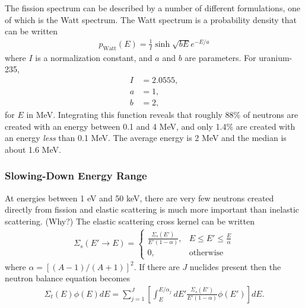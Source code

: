 \documentclass[11pt]{article}
\begin{document}
The fission spectrum can be described by a number of different formulations, one of which is the Watt spectrum.  The Watt spectrum is a probability density that can be written
\begin{align}
  p_\text{Watt}(E) = \frac{1}{I} \sinh\sqrt{bE} e^{-E/a}
\end{align}
where \(I\) is a normalization constant, and \(a\) and \(b\) are parameters.  For uranium-235,
\begin{align}
  I &= 2.0555, \\
  a &= 1, \\
  b &= 2,
\end{align}
for \(E\) in MeV.  Integrating this function reveals that roughly 88\% of neutrons are created with an energy between 0.1 and 4 MeV, and only 1.4\% are created with an energy \emph{less} than 0.1 MeV.  The average energy is 2 MeV and the median is about 1.6 MeV.

\subsubsection{Slowing-Down Energy Range}
\label{sec:orgheadline30}
At energies between 1 eV and 50 keV, there are very few neutrons created directly from fission and elastic scattering is much more important than inelastic scattering.  (Why?)  The elastic scattering cross kernel can be written
\begin{align}
  \Sigma_s(E' \rightarrow E) = 
  \begin{cases}
    \frac{\Sigma_s(E')}{E'(1-\alpha)}, & E \leq E' \leq \frac{E}{\alpha} \\
    0, & \text{otherwise}
  \end{cases}
\end{align}
where \(\alpha = \left[(A-1)/(A+1)\right]^2\).  If there are \(J\) nuclides present then the neutron balance equation becomes
\begin{align}
  \Sigma_t(E) \phi(E) dE
  = \sum_{j=1}^J \left[ \int_E^{E/\alpha_j} dE' \frac{\Sigma_s(E')}{E'(1-\alpha)} \phi(E') \right] dE.
\end{align}
\end{document}
